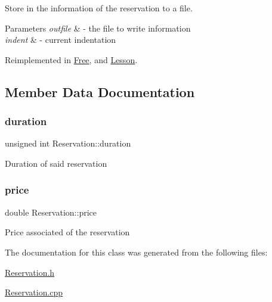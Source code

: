 Store in the information of the reservation to a file. 


\begin{DoxyParams}{Parameters}
{\em outfile} & -\/ the file to write information \\
\hline
{\em indent} & -\/ current indentation \\
\hline
\end{DoxyParams}


Reimplemented in \mbox{\hyperlink{class_free_a5eec9da16ebf4f388d16dd270bd93b64}{Free}}, and \mbox{\hyperlink{class_lesson_a645855060ab3c915a6e0875bc5584887}{Lesson}}.



\subsection{Member Data Documentation}
\mbox{\label{class_reservation_a1a311bb23edebfa226f9c744aefdc7b1}} 
\subsubsection{\texorpdfstring{duration}{duration}}
{\footnotesize\ttfamily unsigned int Reservation\+::duration\hspace{0.3cm}{\ttfamily [protected]}}

Duration of said reservation \mbox{\label{class_reservation_a82e197bd30e7949ee9b8616ee4eacf83}} 
\subsubsection{\texorpdfstring{price}{price}}
{\footnotesize\ttfamily double Reservation\+::price\hspace{0.3cm}{\ttfamily [protected]}}

Price associated of the reservation 

The documentation for this class was generated from the following files\+:\begin{DoxyCompactItemize}
\item 
\mbox{\hyperlink{_reservation_8h}{Reservation.\+h}}\item 
\mbox{\hyperlink{_reservation_8cpp}{Reservation.\+cpp}}\end{DoxyCompactItemize}
